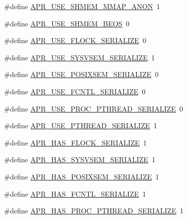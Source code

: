 \begin{DoxyCompactItemize}
\item 
\#define \hyperlink{group__apr__platform_ga7b556f92b8b710978339dc827d2a7a22}{A\+P\+R\+\_\+\+U\+S\+E\+\_\+\+S\+H\+M\+E\+M\+\_\+\+M\+M\+A\+P\+\_\+\+A\+N\+ON}~1
\item 
\#define \hyperlink{group__apr__platform_ga964a36a0d15537eb89733bd92e1159cd}{A\+P\+R\+\_\+\+U\+S\+E\+\_\+\+S\+H\+M\+E\+M\+\_\+\+B\+E\+OS}~0
\item 
\#define \hyperlink{group__apr__platform_ga627ab3fb1738314c7e50616e7e4e9370}{A\+P\+R\+\_\+\+U\+S\+E\+\_\+\+F\+L\+O\+C\+K\+\_\+\+S\+E\+R\+I\+A\+L\+I\+ZE}~0
\item 
\#define \hyperlink{group__apr__platform_ga91ab4154618c08a76cc688ec3f384a27}{A\+P\+R\+\_\+\+U\+S\+E\+\_\+\+S\+Y\+S\+V\+S\+E\+M\+\_\+\+S\+E\+R\+I\+A\+L\+I\+ZE}~1
\item 
\#define \hyperlink{group__apr__platform_gab41840f9559a2eda0aed18e24911d4fa}{A\+P\+R\+\_\+\+U\+S\+E\+\_\+\+P\+O\+S\+I\+X\+S\+E\+M\+\_\+\+S\+E\+R\+I\+A\+L\+I\+ZE}~0
\item 
\#define \hyperlink{group__apr__platform_ga66b87d9b0c7e5b97b8fb21f55a0714d7}{A\+P\+R\+\_\+\+U\+S\+E\+\_\+\+F\+C\+N\+T\+L\+\_\+\+S\+E\+R\+I\+A\+L\+I\+ZE}~0
\item 
\#define \hyperlink{group__apr__platform_ga2738f508b5926ec10a966d2bdb348452}{A\+P\+R\+\_\+\+U\+S\+E\+\_\+\+P\+R\+O\+C\+\_\+\+P\+T\+H\+R\+E\+A\+D\+\_\+\+S\+E\+R\+I\+A\+L\+I\+ZE}~0
\item 
\#define \hyperlink{group__apr__platform_ga28fb90a0db4bd6c6f677b269fc743cda}{A\+P\+R\+\_\+\+U\+S\+E\+\_\+\+P\+T\+H\+R\+E\+A\+D\+\_\+\+S\+E\+R\+I\+A\+L\+I\+ZE}~1
\item 
\#define \hyperlink{group__apr__platform_ga3cdde1dc287da276eb56d7c5ed351713}{A\+P\+R\+\_\+\+H\+A\+S\+\_\+\+F\+L\+O\+C\+K\+\_\+\+S\+E\+R\+I\+A\+L\+I\+ZE}~1
\item 
\#define \hyperlink{group__apr__platform_ga3b4f7591d97f21818b51b793752fa5fe}{A\+P\+R\+\_\+\+H\+A\+S\+\_\+\+S\+Y\+S\+V\+S\+E\+M\+\_\+\+S\+E\+R\+I\+A\+L\+I\+ZE}~1
\item 
\#define \hyperlink{group__apr__platform_ga100a44703cbec87774ad3ba78ce4372a}{A\+P\+R\+\_\+\+H\+A\+S\+\_\+\+P\+O\+S\+I\+X\+S\+E\+M\+\_\+\+S\+E\+R\+I\+A\+L\+I\+ZE}~1
\item 
\#define \hyperlink{group__apr__platform_ga372220e70e4da519ebcaaf8476525227}{A\+P\+R\+\_\+\+H\+A\+S\+\_\+\+F\+C\+N\+T\+L\+\_\+\+S\+E\+R\+I\+A\+L\+I\+ZE}~1
\item 
\#define \hyperlink{group__apr__platform_gabc09d4599769b9cef0e972b0050c9e11}{A\+P\+R\+\_\+\+H\+A\+S\+\_\+\+P\+R\+O\+C\+\_\+\+P\+T\+H\+R\+E\+A\+D\+\_\+\+S\+E\+R\+I\+A\+L\+I\+ZE}~1

\end{DoxyCompactItemize}
